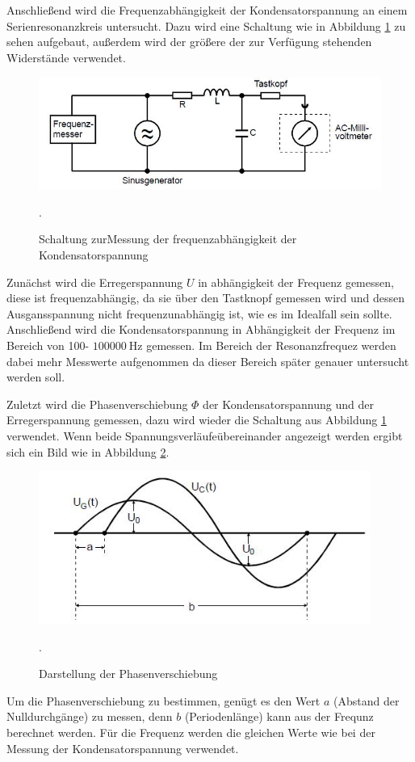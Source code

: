 Anschließend wird die Frequenzabhängigkeit der Kondensatorspannung an einem
Serienresonanzkreis untersucht. Dazu wird eine Schaltung wie in Abbildung
\ref{fig:c} zu sehen aufgebaut, außerdem wird der größere der zur Verfügung
stehenden Widerstände verwendet.
\begin{figure}[H]
  \centering
  \includegraphics[width=13cm]{c.JPG}
  \caption{Schaltung zurMessung der frequenzabhängigkeit der Kondensatorspannung}
  \cite{skript}.
  \label{fig:c}
\end{figure}
Zunächst wird die Erregerspannung $U$ in abhängigkeit der Frequenz gemessen, diese
ist frequenzabhängig, da sie über den Tastknopf gemessen wird und dessen
Ausgansspannung nicht frequenzunabhängig ist, wie es im Idealfall sein sollte.
Anschließend wird die Kondensatorspannung in Abhängigkeit der Frequenz im Bereich
von 100\;- $\SI{100000}{\Hz}$ gemessen. Im Bereich der Resonanzfrequez werden
dabei mehr Messwerte aufgenommen da dieser Bereich später genauer untersucht werden soll.

Zuletzt wird die Phasenverschiebung $\Phi$ der Kondensatorspannung und
der Erregerspannung gemessen, dazu wird wieder die Schaltung aus Abbildung \ref{fig:c}
verwendet. Wenn beide Spannungsverläufeübereinander angezeigt werden ergibt sich ein Bild
wie in Abbildung \ref{fig:phase}.
\begin{figure}[H]
  \centering
  \includegraphics[height=5cm]{phase.JPG}
  \caption{Darstellung der Phasenverschiebung}
  \cite{skript2}.
  \label{fig:phase}
\end{figure}
Um die Phasenverschiebung zu bestimmen, genügt es den Wert $a$ (Abstand der Nulldurchgänge) zu messen, denn
$b$ (Periodenlänge) kann aus der Frequnz berechnet werden. Für die Frequenz werden die gleichen
Werte wie bei der Messung der Kondensatorspannung verwendet.





\label{sec:Durchführung}
